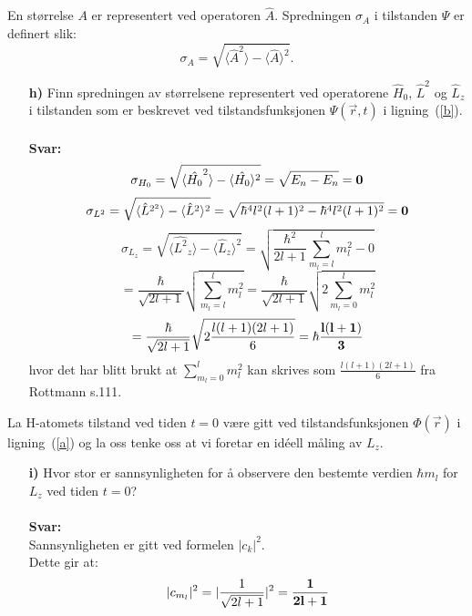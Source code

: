 \documentclass[11pt,a4paper]{report}
\newcounter{excount}[chapter]
\newenvironment{exercise}[1][]{\addtocounter{excount}{1} \noindent {\bf Oppgave
    \arabic{excount} \ \ #1}\hspace{2mm}}{\vspace{4mm}}
\begin{document}
\begin{exercise}[\\]
\noindent
En st{\o}rrelse $A$ er representert ved operatoren $\hat{A}$. Spredningen $\sigma _A$ i tilstanden $\Psi$ er definert slik:
\begin{equation}
\sigma_ A = \sqrt{\langle \hat{A}^2 \rangle - \langle \hat{A} \rangle^2}.
\end{equation}
\begin{itemize}
\item[\bf h)] Finn spredningen av st{\o}rrelsene representert ved operatorene $\hat{H}_{0}$, $\hat{L}^2$ og $\hat{L}_z$ i tilstanden som er beskrevet ved tilstandsfunksjonen $\Psi (\vec{r}, t)$ i ligning~(\ref{b}).\\
\\
\textbf{Svar:}\\
\begin{equation}
\sigma_{H_{0}}=\sqrt{\langle\hat{H_{0}}^{2}\rangle-\langle\hat{H_{0}}\rangle^{2}}=\sqrt{E_{n}-E_{n}}=\bf 0
\end{equation}
\begin{equation}
\sigma_{L^{2}} = \sqrt{\langle\hat{L}^{2^{2}}\rangle-\langle\hat{L}^{2}\rangle^{2}}=\sqrt{\hbar^{4}l^{2}(l+1)^{2}-\hbar^{4}l^{2}(l+1)^{2}} = \bf 0
\end{equation}
\begin{equation}
\sigma_{L_{z}} = \sqrt{\langle\hat{L^{2}}_{z}\rangle-\langle\hat{L}_{z}\rangle^{2}} = \sqrt{\frac{\hbar^{2}}{2l+1}\sum_{m_{l}=l}^{l}m_{l}^{2}-0}
\end{equation}
\begin{equation}
= \frac{\hbar}{\sqrt{2l+1}}\sqrt{\sum_{m_{l}=l}^{l}m_{l}^{2}}=\frac{\hbar}{\sqrt{2l+1}}\sqrt{2\sum_{m_{l}=0}^{l}m_{l}^{2}}
\end{equation}
\begin{equation}
= \frac{\hbar}{\sqrt{2l+1}}\sqrt{2\frac{l(l+1)(2l+1)}{6}}=\bf \hbar\frac{l(l+1)}{3}
\end{equation}
hvor det har blitt brukt at $\sum_{m_{l}=0}^{l}m_{l}^{2}$ kan skrives som $\frac{l(l+1)(2l+1)}{6}$ fra Rottmann s.111.
\end{itemize}

\noindent
La H-atomets tilstand ved tiden $t = 0$ v{\ae}re gitt ved tilstandsfunksjonen $\Phi (\vec{r})$ i ligning~(\ref{a}) og la oss tenke oss at vi foretar en id\'eell
m\aa ling av $L_{z}$.
\begin{itemize}
\item[\bf i)] Hvor stor er sannsynligheten for {\aa} observere den bestemte verdien
$\hbar  m_{l} $ for $L_z$ ved tiden $t = 0$?\\
\\
\textbf{Svar:}\\
Sannsynligheten er gitt ved formelen $|c_{k}|^{2}$.\\
Dette gir at:
\begin{equation}
|c_{m_{l}}|^{2}=|\frac{1}{\sqrt{2l+1}}|^{2}=\bf \frac{1}{2l+1}
\end{equation}



\end{itemize}
\end{exercise}
\end{document}
